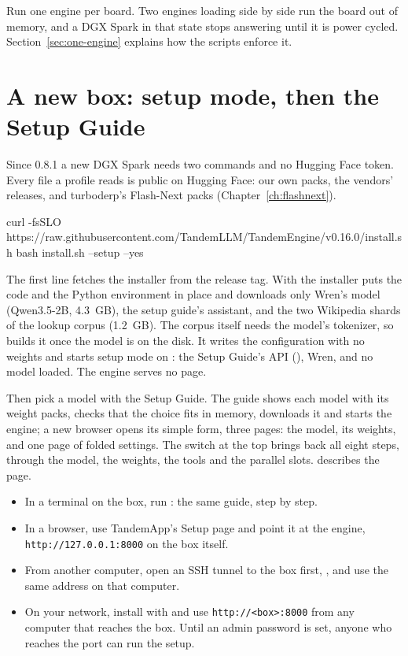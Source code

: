Run one engine per board. Two engines loading side by side run the board out of memory, and a DGX Spark in that state stops answering until it is power cycled. Section~\ref{sec:one-engine} explains how the scripts enforce it.

\section{A new box: setup mode, then the Setup Guide}\label{sec:new-box}

Since 0.8.1 a new DGX Spark needs two commands and no Hugging Face token. Every file a profile reads is public on Hugging Face: our own packs, the vendors' releases, and turboderp's Flash-Next packs (Chapter~\ref{ch:flashnext}).

\begin{shell}
curl -fsSLO https://raw.githubusercontent.com/TandemLLM/TandemEngine/v0.16.0/install.sh
bash install.sh --setup --yes
\end{shell}

The first line fetches the installer from the release tag. With  the installer puts the code and the Python environment in place and downloads only Wren's model (Qwen3.5-2B, 4.3~GB), the setup guide's assistant, and the two Wikipedia shards of the lookup corpus (1.2~GB). The corpus itself needs the model's tokenizer, so  builds it once the model is on the disk. It writes the configuration with no weights and starts setup mode on : the Setup Guide's API (), Wren, and no model loaded. The engine serves no page.

Then pick a model with the Setup Guide. The guide shows each model with its weight packs, checks that the choice fits in memory, downloads it and starts the engine; a new browser opens its simple form, three pages: the model, its weights, and one page of folded settings. The switch at the top brings back all eight steps, through the model, the weights, the tools and the parallel slots.  describes the page.

\begin{itemize}
\item In a terminal on the box, run : the same guide, step by step.
\item In a browser, use TandemApp's Setup page and point it at the engine, \texttt{http://127.0.0.1:8000} on the box itself.
\item From another computer, open an SSH tunnel to the box first, , and use the same address on that computer.
\item On your network, install with  and use \texttt{http://<box>:8000} from any computer that reaches the box. Until an admin password is set, anyone who reaches the port can run the setup.
\end{itemize}

